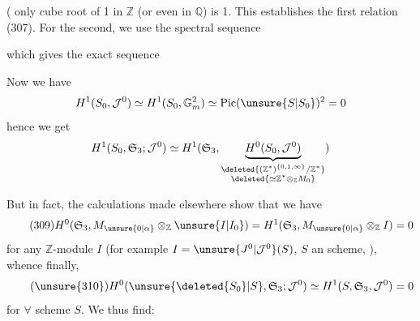 ( only cube  root of 1 in $\mathbb Z$ (or even in $\mathbb Q$) is 1. This establishes the first relation (307). For the second, we use the spectral sequence




which gives the exact sequence

Now we have
\[
H^1(S_0,\mathcal J^0)\simeq H^1(S_0,\mathbb G_m^2)\simeq\operatorname{Pic}(\unsure{S|S_0})^2=0
\]
hence we get
\[
H^1(S_0,\mathfrak S_3;\mathcal J^0)\simeq H^1(\mathfrak S_3,\underbrace{H^0(S_0,\mathcal J^0)}_{\substack{\deleted{(\mathbb Z^*)^{\{0,1,\infty\}}/\mathbb Z^*}\\\deleted{\simeq\mathbb Z^*\otimes_{\mathbb Z}M_0}}})
\]

But in fact, the calculations made elsewhere show that we have
\[
\tag{309}
H^0(\mathfrak S_3,M_{\unsure{0|\alpha}}\otimes_{\mathbb Z}\unsure{I|I_0})=H^1(\mathfrak S_3,M_{\unsure{0|\alpha}}\otimes_{\mathbb Z}I)=0
\]
for any $\mathbb Z$-module $I$ (for example $I=\unsure{J^0|\mathcal J^0}(S)$, $S$ an  scheme, ), whence finally,
\[
\tag{\unsure{310}}
H^0(\unsure{\deleted{S_0}|S},\mathfrak S_3;\mathcal J^0)\simeq H^1(S,\mathfrak S_3,\mathcal J^0)=0
\]
for $\forall$ scheme $S$. We thus find:

